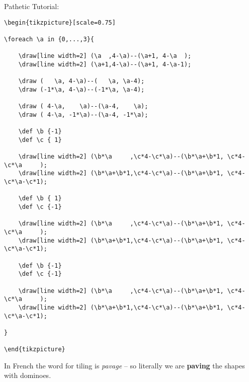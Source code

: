 \documentclass[12pt]{article}
\begin{document}
\newpage

\noindent Pathetic Tutorial:

\selectfont \fontsize{12}{10}\selectfont

\begin{verbatim}
\begin{tikzpicture}[scale=0.75]

\foreach \a in {0,...,3}{

	\draw[line width=2] (\a  ,4-\a)--(\a+1, 4-\a  );
	\draw[line width=2] (\a+1,4-\a)--(\a+1, 4-\a-1);
	
	\draw (   \a, 4-\a)--(   \a, \a-4);
	\draw (-1*\a, 4-\a)--(-1*\a, \a-4);
	
	\draw ( 4-\a,    \a)--(\a-4,    \a);
	\draw ( 4-\a, -1*\a)--(\a-4, -1*\a);

	\def \b {-1}
	\def \c { 1}
		
	\draw[line width=2] (\b*\a     ,\c*4-\c*\a)--(\b*\a+\b*1, \c*4-\c*\a     );
	\draw[line width=2] (\b*\a+\b*1,\c*4-\c*\a)--(\b*\a+\b*1, \c*4-\c*\a-\c*1);
	
	\def \b { 1}
	\def \c {-1}
		
	\draw[line width=2] (\b*\a     ,\c*4-\c*\a)--(\b*\a+\b*1, \c*4-\c*\a     );
	\draw[line width=2] (\b*\a+\b*1,\c*4-\c*\a)--(\b*\a+\b*1, \c*4-\c*\a-\c*1);
	
	\def \b {-1}
	\def \c {-1}
		
	\draw[line width=2] (\b*\a     ,\c*4-\c*\a)--(\b*\a+\b*1, \c*4-\c*\a     );
	\draw[line width=2] (\b*\a+\b*1,\c*4-\c*\a)--(\b*\a+\b*1, \c*4-\c*\a-\c*1);

}

\end{tikzpicture}

\end{verbatim}


\noindent In French the word for tiling is \textit{pavage} -- so literally we are \textbf{paving} the shapes with dominoes. 
\end{document}
